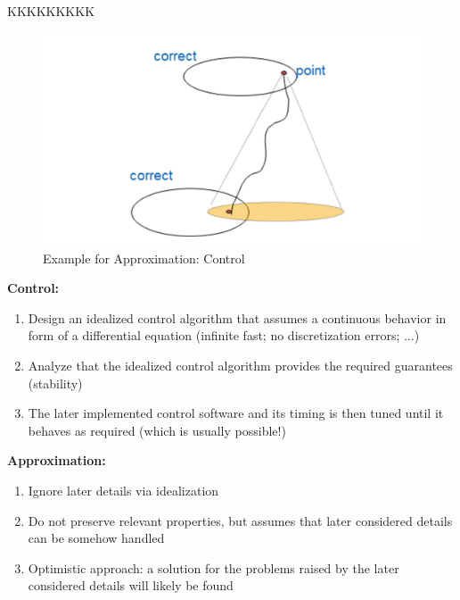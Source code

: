 {KKKKKKKKK

\begin{figure}[!htb]
\centering
\includegraphics[scale=0.33]{figures/mm-hpi19.pdf}
\caption{Example for Approximation: Control}
\label{fig:MMFig15}
\end{figure}

{\bf Control:}

\begin{enumerate}
    \item Design an idealized control algorithm that assumes a continuous behavior in form of a differential equation (infinite fast; no discretization errors; $\ldots$)
\item Analyze that the idealized control algorithm provides the required guarantees (stability)
\item The later implemented control software and its timing is then tuned until it behaves as required (which is usually possible!)
\end{enumerate}


{\bf Approximation:}

\begin{enumerate}
    \item Ignore later details via idealization
\item Do not preserve relevant properties, but assumes that later considered details can be somehow handled
\item Optimistic approach: a solution for the problems raised by the later considered details will likely be found

\end{enumerate}



}

